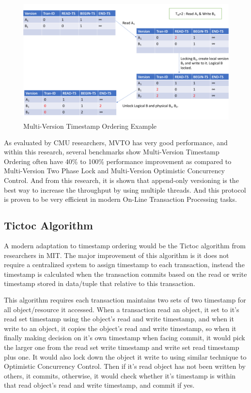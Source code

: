 \begin{figure}[H]
	\centering
	\includegraphics[width=0.9\linewidth]{MVTO.pdf}
	\caption{Multi-Version Timestamp Ordering Example}
\end{figure}

As evaluated by CMU researchers, MVTO has very good performance, and within this research, several benchmarks show Multi-Version Timestamp Ordering often have 40\% to 100\% performance improvement as compared to Multi-Version Two Phase Lock and Multi-Version Optimistic Concurrency Control\cite{wu2017empirical}. And from this research, it is shown that append-only versioning is the best way to increase the throughput by using multiple threads. And this protocol is proven to be very efficient in modern On-Line Transaction Processing tasks.

\subsection{Tictoc Algorithm}

A modern adaptation to timestamp ordering would be the Tictoc algorithm from researchers in MIT\cite{yu2016tictoc}. The major improvement of this algorithm is it does not require a centralized system to assign timestamp to each transaction, instead the timestamp is calculated when the transaction commits based on the read or write timestamp stored in data/tuple that relative to this transaction.

This algorithm requires each transaction maintains two sets of two timestamp for all object/resource it accessed. When a transaction read an object, it set to it's read set timestamp using the object's read and write timestamp, and when it write to an object, it copies the object's read and write timestamp, so when it finally making decision on it's own timestamp when facing commit, it would pick the larger one from the read set write timestamp and write set read timestamp plus one. It would also lock down the object it write to using similar technique to Optimistic Concurrency Control. Then if it's read object has not been written by others, it commits, otherwise, it would check whether it's timestamp is within that read object's read and write timestamp, and commit if yes.


